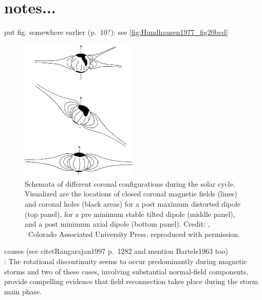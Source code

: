 

\section{notes...}

put fig. somewhere earlier (p.~10?): see \autoref{fig:Hundhausen1977_fig20bcd}\\
\begin{figure}[htb]
	\centering
	\includegraphics[width=0.5\textwidth]{figures_of_others/images/Hundhausen1977_fig20bcd.png}
	\caption[Credit: {\citep[Fig.~20, panels (b--d)]{Hundhausen1977}}, \textcopyright~Colorado Associated University Press, reproduced with permission.]
	{Schemata of different coronal configurations during the solar cycle. Visualized are the locations of closed coronal magnetic fields (lines) and coronal holes (black areas) for a post maximum distorted dipole (top panel), for a pre minimum stable tilted dipole (middle panel), and a post minimum axial dipole (bottom panel). Credit: {\citep[Fig.~20, panels (b--d)]{Hundhausen1977}}, \textcopyright~Colorado Associated University Press, reproduced with permission.}
	\label{fig:Hundhausen1977_fig20bcd}
\end{figure}

causes (see citet{Rangarajan1997} p.~1282 and mention Bartels1963 too)\\

\citet{Sonnerup1967}: The rotational discontinuity seems to occur predominantly during magnetic storms and two of these cases, involving substantial normal-field components, provide compelling evidence that field reconnection takes place during the storm main phase.\\

